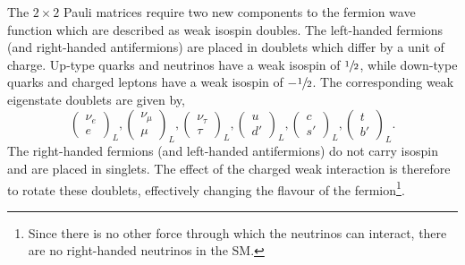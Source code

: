 The $2 \times 2$ Pauli matrices require two new components to the fermion wave function which are described as weak isospin doubles.
The left-handed fermions (and right-handed antifermions)
are placed in doublets which differ by a unit of charge.
Up-type quarks and neutrinos have a weak isospin of $\sfrac{1}{2}$, while down-type quarks and charged leptons have a weak isospin of $-\sfrac{1}{2}$.
The corresponding weak eigenstate doublets are given by,
\begin{equation}
    \label{eq:weak_isospin}
    \begin{pmatrix} \nu_e \\ e \end{pmatrix}_L,
    \begin{pmatrix} \nu_\mu \\ \mu \end{pmatrix}_L,
    \begin{pmatrix} \nu_\tau \\ \tau \end{pmatrix}_L,
    \begin{pmatrix} u \\ d' \end{pmatrix}_L,
    \begin{pmatrix} c \\ s' \end{pmatrix}_L,
    \begin{pmatrix} t \\ b' \end{pmatrix}_L.
\end{equation}
The right-handed fermions (and left-handed antifermions) do not carry isospin and are placed in singlets.
The effect of the charged weak interaction is therefore to rotate these doublets, effectively changing the flavour of the fermion\footnote{Since there is no other force through which the neutrinos can interact, there are no right-handed neutrinos in the SM.}.

